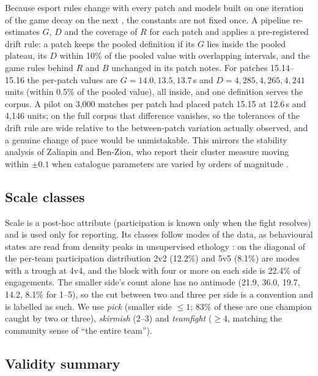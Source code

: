 Because esport rules change with every patch and models built on one iteration of the
game decay on the next \cite{chitayat2023beyond}, the constants are not fixed once. A
pipeline re-estimates $G$, $D$ and the coverage of $R$ for each patch and applies a
pre-registered drift rule: a patch keeps the pooled definition if its $G$ lies inside the
pooled plateau, its $D$ within 10\% of the pooled value with overlapping intervals, and the
game rules behind $R$ and $B$ unchanged in its patch notes. For patches 15.14--15.16 the per-patch values are
$G = 14.0, 13.5, 13.7$\,s and $D = 4{,}285, 4{,}265, 4{,}241$ units (within 0.5\% of the
pooled value), all inside, and one definition serves the corpus. A pilot on 3,000 matches
per patch had placed patch 15.15 at 12.6\,s and 4,146 units; on the full corpus that
difference vanishes, so the tolerances of the drift rule are wide relative to the
between-patch variation actually observed, and a genuine change of pace would be
unmistakable. This mirrors the stability analysis of Zaliapin and
Ben-Zion, who report their cluster measure moving within $\pm0.1$ when catalogue
parameters are varied by orders of magnitude \cite{zaliapin2013clusters}.

\subsection{Scale classes}

Scale is a post-hoc attribute (participation is known only when the fight resolves) and is
used only for reporting. Its classes follow modes of the data, as behavioural states are
read from density peaks in unsupervised ethology \cite{berman2014mapping}: on the diagonal
of the per-team participation distribution 2v2 (12.2\%) and 5v5 (8.1\%) are modes with a
trough at 4v4, and the block with four or more on each side is 22.4\% of engagements. The
smaller side's count alone has no antimode (21.9, 36.0, 19.7, 14.2, 8.1\% for 1--5), so
the cut between two and three per side is a convention and is labelled as such. We use
\emph{pick} (smaller side $\leq 1$; 83\% of these are one champion caught by two or three),
\emph{skirmish} (2--3) and \emph{teamfight} ($\geq 4$, matching the community sense of
``the entire team'').

\subsection{Validity summary}

